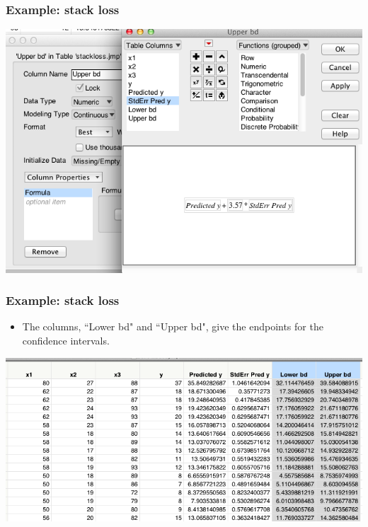 \documentclass[handout]{beamer}\usepackage[]{graphicx}\usepackage[]{color}
\numberwithin{equation}{section}
\begin{document}
\begin{frame}
\frametitle{Example: stack loss}
 \includegraphics{../../fig/msl2.png}
\end{frame}

\begin{frame}
\frametitle{Example: stack loss}
\begin{itemize}
\item The columns, ``Lower bd" and ``Upper bd", give the endpoints for the confidence intervals.
\end{itemize}
 \includegraphics{../../fig/msl3.png}
\end{frame}
\end{document}
